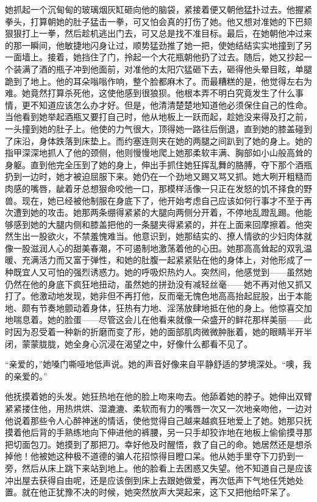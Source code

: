     她抓起一个沉甸甸的玻璃烟灰缸砸向他的脑袋，紧接着便又朝他猛扑过去。他握紧拳头，打算朝她的肚子猛击一拳，可又怕会真的打伤了她。他又想对准她的下巴颏狠狠打上一拳，然后趁机逃出门去，可又总是找不准目标。最后，在她朝他冲过来的那一瞬间，他敏捷地闪身让过，顺势猛劲推了她一把，使她结结实实地撞到了另一面墙上。接着，她挡住了门，拎起一个大花瓶朝他扔了过去。随后，她又抄起一个装满了酒的瓶子冲到他面前，对准他的太阳穴猛砸下去，砸得他头晕目眩，单腿跪到了地上。他的耳朵嗡嗡作响，整个脸都麻木了。而最糟糕的是，他觉得左右为难。她竟然打算杀死他，这使他感到很狼狈。他根本弄不明白究竟发生了什么事情，更不知道应该怎么办才好。但是，他清清楚楚地知道他必须保住自己的性命。当他看到她举起酒瓶又要打自己时，他从地板上一跃而起，趁她没来得及打之前，一头撞到她的肚子上。他使的力气很大，顶得她一路往后倒退，直到她的膝盖碰到了床沿，身体跌落到床垫上。而约塞连则夹在她的两腿之间趴到了她的身上。她的指甲深深地抓人了他的颈侧，他则慢慢地爬上她那柔软丰满、胸部如小山般高耸的身躯。直到他完全压到了她的身上，伸出手抓住她狂挥乱舞的胳膊，夺下那个酒瓶扔到一边时，她才被迫屈服下来。她仍在一个劲地又踢又骂又抓。她大咧开粗糙而肉感的嘴唇，龇着牙总想狠命咬他一口，那模样活像一只正在发怒的饥不择食的野兽。现在，她已经被他制服在身底下了，他开始考虑自己应该如何行事才不至于再次遭到她的攻击。她那两条绷得紧紧的大腿向两侧分开着，不停地乱蹬乱踢。他能够感到她的大腿内侧和膝盖把他的一条腿夹得紧紧的，并在上面来回摩擦着。他突然生出一股欲火，不禁羞愧难当。他意识到，她那结实的、撩人情欲的少妇肉体就像一股滋润人心的甜美春潮，不可遏制地激荡着他的心田。她那高高耸起的双乳温暖、充满活力而又富于弹性，和她的肚腹一起紧紧贴在他的身体上，对他形成了一种既宜人又可怕的强烈诱惑力。她的呼吸炽热灼人。突然间，他感觉到——虽然她仍然在他的身底下疯狂地扭动，虽然她的拼劲没有减轻丝毫——她不再对他又抓又打了。他激动地发现，她非但不再打他，反而毫无愧色地高高抬起屁股，出于本能地、颇有节奏地颤动着身体，狂热有力地、淫荡放肆地抵在他的身上。他惊喜交加地喘息着。她的脸蛋——尽管这会儿在他看来就像一朵盛开的鲜花那样美丽——此时因为忍受着一种新的折磨而变了形，她的面部肌肉微微肿胀着，她的眼睛半开半闭，蒙蒙胧胧，她全身心沉浸在渴望之中，好像什么都看不见了。

    “亲爱的，”她嗓门嘶哑地低声说。她的声音好像来自平静舒适的梦境深处。“噢，我的亲爱的。”

    他抚摸着她的头发。她狂热地在他的脸上吻来吻去。他舔着她的脖子。她伸出双臂紧紧搂住他，用热烘烘、湿漉漉、柔软而有力的嘴唇一次又一次地亲吻他，一边对他说着那些令人心醉神迷的情话，使他觉得自己越来越疯狂地爱上了她。她那只抚摸着他后背的手熟练地向下伸进他的裤腰，另一只手却狡诈地在地板上偷偷摸寻那把切面包刀。她摸到了那把刀。幸好他及时醒悟，救了自己的命。她居然还是想杀掉他！他被她这种极不道德的骗人花招惊得目瞪口呆。他从她手里夺下刀扔到一旁，然后从床上跳下来站到地上。他的脸看上去困惑又失望。他不知道自己是应该冲出屋去获得自由呢，还是应该倒到床上去跟她做爱，再次低声下气地任凭她处置。就在他正犹豫不决的时候，她突然放声大哭起来，这下又把他给吓呆了。

